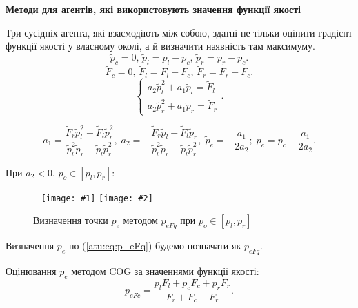 \documentclass[14pt,handout,utf8]{beamer}
\newcommand{\Xhead}[1]{
 \begin{center}%
      \textbf{#1}%
 \end{center}%
}
\newcommand{\PicDoubleNL}[2]{%
 \begin{center}
    ~ \hfill
    \texttt{[image: \#1]}
    \hfill
    \texttt{[image: \#2]}
    \hfill ~
  \end{center}
}
\begin{document}
\begin{frame}
  \frametitle{~}

  \Xhead{Методи для агентів, які використовують значення функції якості}

  Три сусідніх агента, які взаємодіють між собою, здатні не тільки оцінити градієнт
  функції якості у власному околі, а й визначити наявність там
  максимуму.
  \[
    \tilde{p}_c = 0, \,
    \tilde{p}_l = p_l - p_c, \,
    \tilde{p}_r = p_r - p_c.
  \]
  \[
    \tilde{F}_c = 0, \,
    \tilde{F}_l = F_l - F_c, \,
    \tilde{F}_r = F_r - F_c.
  \]
    \[
    \left\{
      \begin{array}{l}
        a_2 \tilde{p}_l^2 + a_1 \tilde{p}_l  = \tilde{F}_l
        \\
        a_2 \tilde{p}_r^2 + a_1 \tilde{p}_r  = \tilde{F}_r
      \end{array}
    \right. .
  \]

  \begin{equation}
    a_1 = \frac{\tilde{F}_r \tilde{p}_l^2 - \tilde{F}_l \tilde{p}_r^2 }
              { \tilde{p}_l^2 \tilde{p}_r  - \tilde{p}_l \tilde{p}_r^2 },
    \;
    a_2 = - \frac{\tilde{F}_r \tilde{p}_l - \tilde{F}_l \tilde{p}_r }
               { \tilde{p}_l^2 \tilde{p}_r  - \tilde{p}_l \tilde{p}_r^2 },
    \;
    \tilde{p}_e = - \frac{a_1}{2 a_2};
    \;
    p_e = p_c - \frac{a_1}{2 a_2}.
    \label{atu:eq:p_eFq}
  \end{equation}

  При $a_2<0$, $p_o \in [p_l,p_r]$:

  \begin{figure}
    \PicDoubleNL{../p3/p/p_eFq/q_p_eFq_p49_xl.png}{../p3/p/p_eFq/q_p_eFq_p70_xl.png}
    \caption{Визначення точки $p_e$ методом $p_{eFq}$ при $p_o \in [p_l, p_r]$}
    \label{atu:f:p_eFq_intra}
  \end{figure}

  Визначення $p_e$ по (\ref{atu:eq:p_eFq}) будемо позначати як $p_{eFq}$.

  Оцінювання $p_e$ методом COG за значеннями функції якості:
 \begin{equation}
   p_{eFc }=
   \frac{p_l F_l + p_c F_c + p_r F_r}{ F_r + F_c + F_r}  .
   \label{atu:eq:p_eFc}
 \end{equation}


\end{frame}
\end{document}
